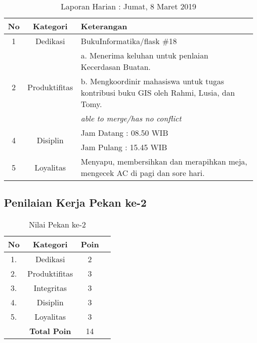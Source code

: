 \begin{table}[htp]
\begin{center}
\caption{Laporan Harian : Jumat, 8 Maret 2019}
\label{tab:lh080319}
\begin{tabularx}{\textwidth}{|l|l|X|}
\hline
\multicolumn{1}{|c|}{\textbf{No}} & \multicolumn{1}{c|}{\textbf{Kategori}} & \textbf{Keterangan} \\ \hline
\multicolumn{1}{|c|}{\multirow{1}{*}{1}} & \multicolumn{1}{c|}{\multirow{1}{*}{\parbox{2.5cm}{Dedikasi}}}
& BukuInformatika/flask \#18 \\
\hline
\multicolumn{1}{|c|}{\multirow{3}{*}{2}} & \multicolumn{1}{c|}{\multirow{3}{*}{\parbox{2.5cm}{Produktifitas}}}
& a. Menerima keluhan untuk penlaian Kecerdasan Buatan.\\
\multicolumn{1}{|c|}{\multirow{1}{*}{}} & \multicolumn{1}{c|}{\multirow{1}{*}{\parbox{2.5cm}{}}}
& b. Mengkoordinir mahasiswa untuk tugas kontribusi buku GIS oleh Rahmi, Lusia, dan Tomy.\\
\hline
\multicolumn{1}{|c|}{\multirow{1}{*}{3}} & \multicolumn{1}{c|}{\multirow{1}{*}{\parbox{2.5cm}{Integritas}}}
& \textit{able to merge/has no conflict} \\
\hline
\multicolumn{1}{|c|}{\multirow{2}{*}{4}} & \multicolumn{1}{c|}{\multirow{2}{*}{\parbox{2.5cm}{Disiplin}}}
& Jam Datang : 08.50 WIB \\
\multicolumn{1}{|c|}{\multirow{1}{*}{}} & \multicolumn{1}{c|}{\multirow{1}{*}{\parbox{2.5cm}{}}}
& Jam Pulang : 15.45 WIB \\
\hline
\multicolumn{1}{|c|}{\multirow{2}{*}{5}} & \multicolumn{1}{c|}{\multirow{2}{*}{\parbox{2.5cm}{Loyalitas}}}
& Menyapu, membersihkan dan merapihkan meja, mengecek AC di pagi dan sore hari.\\
\hline
\end{tabularx}
\end{center}
\end{table}

\subsection{Penilaian Kerja Pekan ke-2}

\begin{table}[htp]
\centering
\caption{Nilai Pekan ke-2}
\label{tab:nm02}
\begin{tabular}{|c|c|c|p{\textwidth}|}
\hline
\textbf{No} & \textbf{Kategori} & \textbf{Poin} \\ \hline
1. & Dedikasi & 2 \\ \hline
2. & Produktifitas & 3 \\ \hline
3. & Integritas & 3 \\ \hline
4. & Disiplin & 3 \\ \hline
5. & Loyalitas & 3 \\ \hline
 & \textbf{Total Poin} & 14 \\ \hline
\end{tabular}
\end{table}

